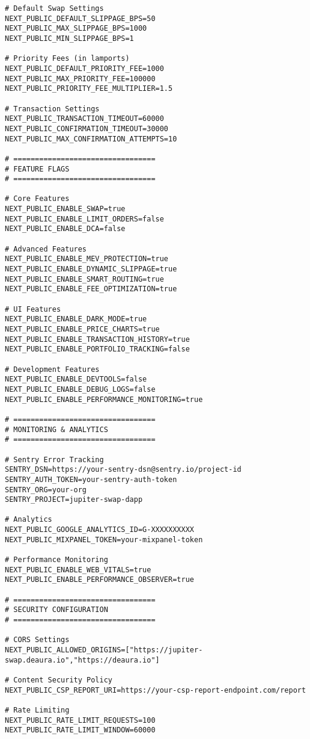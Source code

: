 \documentclass[11pt,a4paper]{article}
\begin{document}
\begin{lstlisting}[style=env, caption=.env.local (Production)]
# Default Swap Settings
NEXT_PUBLIC_DEFAULT_SLIPPAGE_BPS=50
NEXT_PUBLIC_MAX_SLIPPAGE_BPS=1000
NEXT_PUBLIC_MIN_SLIPPAGE_BPS=1

# Priority Fees (in lamports)
NEXT_PUBLIC_DEFAULT_PRIORITY_FEE=1000
NEXT_PUBLIC_MAX_PRIORITY_FEE=100000
NEXT_PUBLIC_PRIORITY_FEE_MULTIPLIER=1.5

# Transaction Settings
NEXT_PUBLIC_TRANSACTION_TIMEOUT=60000
NEXT_PUBLIC_CONFIRMATION_TIMEOUT=30000
NEXT_PUBLIC_MAX_CONFIRMATION_ATTEMPTS=10

# =================================
# FEATURE FLAGS
# =================================

# Core Features
NEXT_PUBLIC_ENABLE_SWAP=true
NEXT_PUBLIC_ENABLE_LIMIT_ORDERS=false
NEXT_PUBLIC_ENABLE_DCA=false

# Advanced Features
NEXT_PUBLIC_ENABLE_MEV_PROTECTION=true
NEXT_PUBLIC_ENABLE_DYNAMIC_SLIPPAGE=true
NEXT_PUBLIC_ENABLE_SMART_ROUTING=true
NEXT_PUBLIC_ENABLE_FEE_OPTIMIZATION=true

# UI Features
NEXT_PUBLIC_ENABLE_DARK_MODE=true
NEXT_PUBLIC_ENABLE_PRICE_CHARTS=true
NEXT_PUBLIC_ENABLE_TRANSACTION_HISTORY=true
NEXT_PUBLIC_ENABLE_PORTFOLIO_TRACKING=false

# Development Features
NEXT_PUBLIC_ENABLE_DEVTOOLS=false
NEXT_PUBLIC_ENABLE_DEBUG_LOGS=false
NEXT_PUBLIC_ENABLE_PERFORMANCE_MONITORING=true

# =================================
# MONITORING & ANALYTICS
# =================================

# Sentry Error Tracking
SENTRY_DSN=https://your-sentry-dsn@sentry.io/project-id
SENTRY_AUTH_TOKEN=your-sentry-auth-token
SENTRY_ORG=your-org
SENTRY_PROJECT=jupiter-swap-dapp

# Analytics
NEXT_PUBLIC_GOOGLE_ANALYTICS_ID=G-XXXXXXXXXX
NEXT_PUBLIC_MIXPANEL_TOKEN=your-mixpanel-token

# Performance Monitoring
NEXT_PUBLIC_ENABLE_WEB_VITALS=true
NEXT_PUBLIC_ENABLE_PERFORMANCE_OBSERVER=true

# =================================
# SECURITY CONFIGURATION
# =================================

# CORS Settings
NEXT_PUBLIC_ALLOWED_ORIGINS=["https://jupiter-swap.deaura.io","https://deaura.io"]

# Content Security Policy
NEXT_PUBLIC_CSP_REPORT_URI=https://your-csp-report-endpoint.com/report

# Rate Limiting
NEXT_PUBLIC_RATE_LIMIT_REQUESTS=100
NEXT_PUBLIC_RATE_LIMIT_WINDOW=60000


\end{lstlisting}
\end{document}
